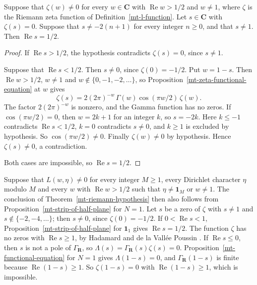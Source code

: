 \begin{proposition}\label{mt-riemann-of-half-plane}
Suppose that $\zeta(w)\neq0$ for every $w\in\mathbf C$ with $\operatorname{Re}w>1/2$ and $w\neq1$,
where $\zeta$ is the Riemann zeta function of Definition~\ref{mt-l-function}. Let $s\in\mathbf C$
with $\zeta(s)=0$. Suppose that $s\neq-2(n+1)$ for every integer $n\geq0$, and that $s\neq1$. Then
$\operatorname{Re}s=1/2$.
\end{proposition}
\begin{proof}
If $\operatorname{Re}s>1/2$, the hypothesis contradicts $\zeta(s)=0$, since $s\neq1$.

Suppose that $\operatorname{Re}s<1/2$. Then $s\neq0$, since $\zeta(0)=-1/2$. Put $w=1-s$. Then
$\operatorname{Re}w>1/2$, $w\neq1$ and $w\notin\{0,-1,-2,\ldots\}$, so
Proposition~\ref{mt-zeta-functional-equation} at $w$ gives
\[
 \zeta(s)=2(2\pi)^{-w}\,\Gamma(w)\cos(\pi w/2)\,\zeta(w).
\]
The factor $2(2\pi)^{-w}$ is nonzero, and the Gamma function has no zeros. If $\cos(\pi w/2)=0$,
then $w=2k+1$ for an integer $k$, so $s=-2k$. Here $k\leq-1$ contradicts
$\operatorname{Re}s<1/2$, $k=0$ contradicts $s\neq0$, and $k\geq1$ is excluded by hypothesis. So
$\cos(\pi w/2)\neq0$. Finally $\zeta(w)\neq0$ by hypothesis. Hence $\zeta(s)\neq0$, a
contradiction.

Both cases are impossible, so $\operatorname{Re}s=1/2$.
\end{proof}

\begin{remark}\label{mt-riemann-via-strip}
Suppose that $L(w,\eta)\neq0$ for every integer $M\geq1$, every Dirichlet character $\eta$ modulo
$M$ and every $w$ with $\operatorname{Re}w>1/2$ such that $\eta\neq\mathbf 1_M$ or $w\neq1$. The
conclusion of Theorem~\ref{mt-riemann-hypothesis} then also follows from
Proposition~\ref{mt-strip-of-half-plane} for $N=1$. Let $s$ be a zero of $\zeta$ with $s\neq1$ and
$s\notin\{-2,-4,\ldots\}$; then $s\neq0$, since $\zeta(0)=-1/2$. If $0<\operatorname{Re}s<1$,
Proposition~\ref{mt-strip-of-half-plane} for $\mathbf 1_1$ gives $\operatorname{Re}s=1/2$. The
function $\zeta$ has no zeros with $\operatorname{Re}s\geq1$, by Hadamard and de la Vallée Poussin
\cite{Had96,VP96}. If $\operatorname{Re}s\leq0$, then $s$ is not a pole of $\Gamma_{\mathbf R}$, so
$\Lambda(s)=\Gamma_{\mathbf R}(s)\zeta(s)=0$. Proposition~\ref{mt-functional-equation} for $N=1$
gives $\Lambda(1-s)=0$, and $\Gamma_{\mathbf R}(1-s)$ is finite because
$\operatorname{Re}(1-s)\geq1$. So $\zeta(1-s)=0$ with $\operatorname{Re}(1-s)\geq1$, which is
impossible.
\end{remark}

